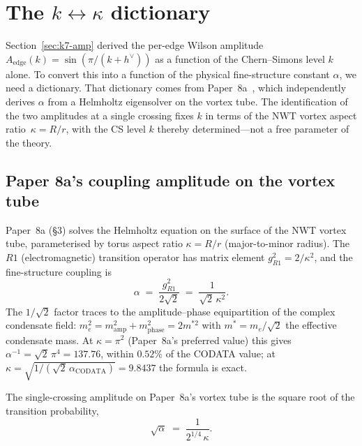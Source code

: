 \documentclass[11pt]{article}
\newcommand{\hv}{h^{\vee}}
\begin{document}
\section{The $k \leftrightarrow \kappa$ dictionary}
\label{sec:k-alpha}

Section~\ref{sec:k7-amp} derived the per-edge Wilson amplitude
$A_{\mathrm{edge}}(k) = \sin(\pi/(k + \hv))$ as a function of the
Chern--Simons level $k$ alone.  To convert this into a function of
the physical fine-structure constant $\alpha$, we need a
dictionary.  That dictionary comes from Paper~8a~\cite{paper8a},
which independently derives $\alpha$ from a Helmholtz eigensolver
on the vortex tube.  The identification of the two amplitudes at
a single crossing fixes $k$ in terms of the NWT vortex aspect
ratio~$\kappa = R/r$, with the CS level $k$ thereby
determined---not a free parameter of the theory.

\subsection{Paper 8a's coupling amplitude on the vortex tube}
\label{sec:k-alpha-paper8a}

Paper~8a (\S3) solves the Helmholtz equation on the surface of the
NWT vortex tube, parameterised by torus aspect ratio
$\kappa = R/r$ (major-to-minor radius).  The $R1$
(electromagnetic) transition operator has matrix element
$g^2_{R1} = 2/\kappa^2$, and the fine-structure coupling is
\begin{equation}
  \alpha \;=\; \frac{g^2_{R1}}{2\sqrt{2}}
            \;=\; \frac{1}{\sqrt{2}\,\kappa^2}.
  \label{eq:paper8a-alpha}
\end{equation}
The $1/\sqrt{2}$ factor traces to the amplitude--phase
equipartition of the complex condensate field:
$m_e^2 = m_{\mathrm{amp}}^2 + m_{\mathrm{phase}}^2 = 2 m^{*2}$ with
$m^* = m_e/\sqrt{2}$ the effective condensate mass.  At
$\kappa = \pi^2$ (Paper~8a's preferred value) this gives
$\alpha^{-1} = \sqrt{2}\,\pi^4 = 137.76$, within $0.52\%$ of the
CODATA value; at
$\kappa = \sqrt{1/(\sqrt{2}\,\alpha_{\mathrm{CODATA}})} = 9.8437$
the formula is exact.

The single-crossing amplitude on Paper~8a's vortex tube is the
square root of the transition probability,
\begin{equation}
  \sqrt{\alpha}
  \;=\; \frac{1}{2^{1/4}\,\kappa}.
  \label{eq:paper8a-sqrt-alpha}
\end{equation}
\end{document}

